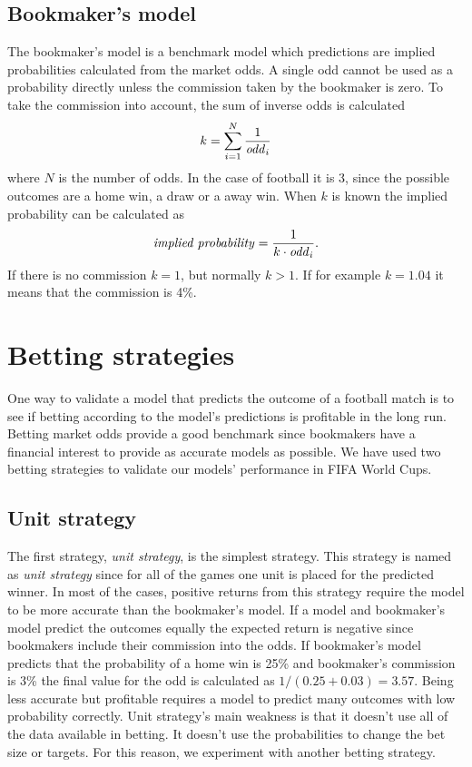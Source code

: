 \subsection{Bookmaker's model}
The bookmaker's model is a benchmark model which predictions are implied probabilities calculated from the market odds. A single odd cannot be used as a probability directly unless the commission taken by the bookmaker is zero. To take the commission into account, the sum of inverse odds is calculated
\begin{equation}
    k = \sum_{i=1}^{N}\frac{1}{\text{\textit{odd}}_i}
\end{equation}
where $N$ is the number of odds. In the case of football it is 3, since the possible outcomes are a home win,  a draw or a away win.
When $k$ is known the implied probability can be calculated as
\begin{equation}
    \text{\textit{implied probability}} = \frac{1}{k \cdot \text{\textit{odd}}_i}\text{.}
\end{equation}
If there is no commission $k=1$, but normally $k>1$. If for example $k=1.04$ it means that the commission is 4\%.

\section{Betting strategies}
One way to validate a model that predicts the outcome of a football match is to see if betting according to the model's predictions is profitable in the long run. Betting market odds provide a good benchmark since bookmakers have a financial interest to provide as accurate models as possible. We have used two betting strategies to validate our models' performance in FIFA World Cups.

\subsection{Unit strategy}
The first strategy, \textit{unit strategy}, is the simplest strategy. This strategy is named as \textit{unit strategy} since for all of the games one unit is placed for the predicted winner. In most of the cases, positive returns from this strategy require the model to be more accurate than the bookmaker's model. If a model and bookmaker's model predict the outcomes equally the expected return is negative since bookmakers include their commission into the odds. If bookmaker's model predicts that the probability of a home win is 25\% and bookmaker's commission is 3\% the final value for the odd is calculated as $1/(0.25+0.03) = 3.57$. Being less accurate but profitable requires a model to predict many outcomes with low probability correctly. Unit strategy's main weakness is that it doesn't use all of the data available in betting. It doesn't use the probabilities to change the bet size or targets. For this reason, we experiment with another betting strategy.

